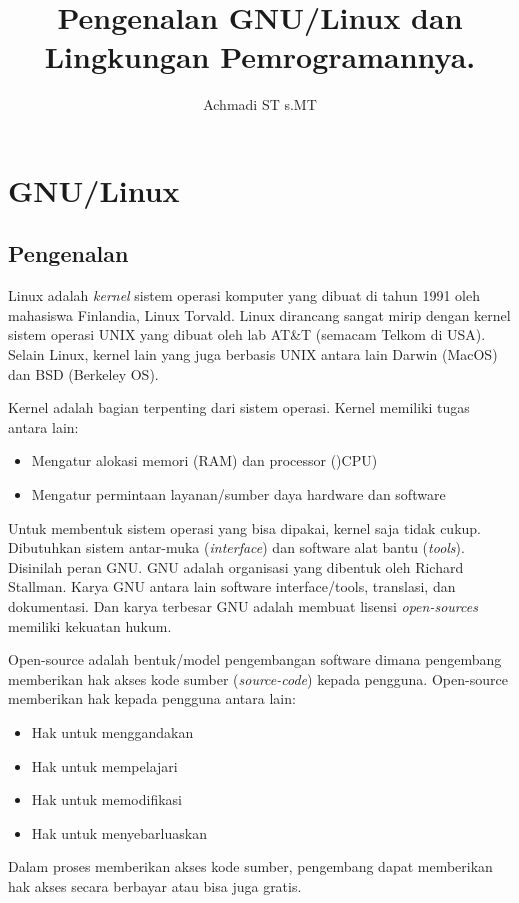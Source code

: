 \documentclass[12pt,]{article}
\title{\Large \bf
	Pengenalan GNU/Linux dan Lingkungan Pemrogramannya.
}
\author{Achmadi ST s.MT}
\date{}
\begin{document}
	\maketitle
	\thispagestyle{empty}
	\pagestyle{empty}
	
	\newpage
	\tableofcontents
	
	\newpage
	\section{GNU/Linux}
	
	\subsection{Pengenalan}
	\hspace{10pt} Linux adalah \textit{kernel} sistem operasi komputer yang dibuat di tahun 1991 oleh mahasiswa Finlandia, Linux Torvald.
	Linux dirancang sangat mirip dengan kernel sistem operasi UNIX yang dibuat oleh lab AT\&T (semacam Telkom di USA).
	Selain Linux, kernel lain yang juga berbasis UNIX antara lain Darwin (MacOS) dan BSD (Berkeley OS).
	
	Kernel adalah bagian terpenting dari sistem operasi.
	Kernel memiliki tugas antara lain:
	\begin{itemize}
		\item Mengatur alokasi memori (RAM) dan processor ()CPU)
		\item Mengatur permintaan layanan/sumber daya hardware dan software
	\end{itemize}
	
	Untuk membentuk sistem operasi yang bisa dipakai, kernel saja tidak cukup.
	Dibutuhkan sistem antar-muka (\textit{interface}) dan software alat bantu (\textit{tools}).
	Disinilah peran GNU. 
	GNU adalah organisasi yang dibentuk oleh Richard Stallman.
	Karya GNU antara lain software interface/tools, translasi, dan dokumentasi.
	Dan karya terbesar GNU adalah membuat lisensi \textit{open-sources} memiliki kekuatan hukum.
	
	Open-source adalah bentuk/model pengembangan software dimana pengembang memberikan hak akses kode sumber (\textit{source-code}) kepada pengguna.
	Open-source memberikan hak kepada pengguna antara lain:
	\begin{itemize}
		\item Hak untuk menggandakan
		\item Hak untuk mempelajari
		\item Hak untuk memodifikasi
		\item Hak untuk menyebarluaskan
	\end{itemize}
	Dalam proses memberikan akses kode sumber, pengembang dapat memberikan hak akses secara berbayar atau bisa juga gratis.
	
\end{document}
